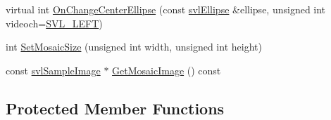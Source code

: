 \begin{DoxyCompactItemize}
virtual int \hyperlink{classsvl_filter_image_tracker_a70615f5930aac32a80f90966eb10b11b}{On\-Change\-Center\-Ellipse} (const \hyperlink{structsvl_ellipse}{svl\-Ellipse} \&ellipse, unsigned int videoch=\hyperlink{svl_definitions_8h_ab9fec7615f19c8df2919eebcab0b187f}{S\-V\-L\-\_\-\-L\-E\-F\-T})
\item 
int \hyperlink{classsvl_filter_image_tracker_ac8cf1608d9f290d07cbd4b309a3ee3d3}{Set\-Mosaic\-Size} (unsigned int width, unsigned int height)
\item 
const \hyperlink{classsvl_sample_image}{svl\-Sample\-Image} $\ast$ \hyperlink{classsvl_filter_image_tracker_abb0447daedbd2b6785328bee27e9e69b}{Get\-Mosaic\-Image} () const 
\end{DoxyCompactItemize}
\subsection*{Protected Member Functions}
